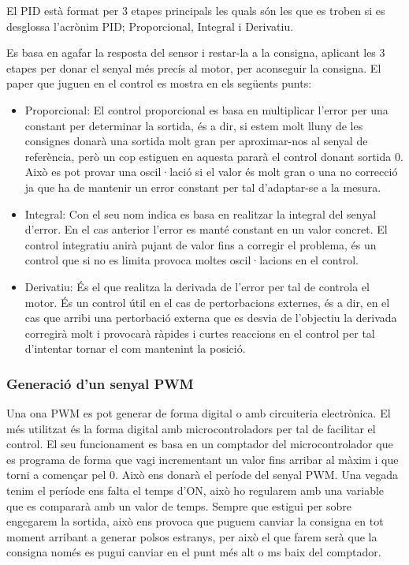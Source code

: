 El PID està format per 3 etapes principals les quals són les que es troben si es desglossa l'acrònim PID; Proporcional, Integral i Derivatiu.

Es basa en agafar la resposta del sensor i restar-la a la consigna, aplicant les 3 etapes per donar el senyal més precís al motor, per aconseguir la consigna. El paper que juguen en el control es mostra en els següents punts: 

\begin{itemize}
    \item Proporcional: El control proporcional es basa en multiplicar l'error per una constant per determinar la sortida, és a dir, si estem molt lluny de les consignes donarà una sortida molt gran per aproximar-nos al senyal de referència, però un cop estiguen en aquesta pararà el control donant sortida 0. Això es pot provar una oscil·lació si el valor és molt gran o una no correcció ja que ha de mantenir un error constant per tal d'adaptar-se a la mesura.
    
    \item Integral: Con el seu nom indica es basa en realitzar la integral del senyal d'error. En el cas anterior l'error es manté constant en un valor concret. El control integratiu anirà pujant de valor fins a corregir el problema, és un control que si no es limita provoca moltes oscil·lacions en el control. 
    
    \item Derivatiu: És el que realitza la derivada de l'error per tal de controla el motor. És un control útil en el cas de pertorbacions externes, és a dir, en el cas que arribi una pertorbació externa que es desvia de l'objectiu la derivada corregirà molt i provocarà ràpides i curtes reaccions en el control per tal d'intentar tornar el com mantenint la posició.
\end{itemize}    
    
\subsubsection{Generació d'un senyal PWM}
Una ona PWM es pot generar de forma digital o amb circuiteria electrònica. El més utilitzat és la forma digital amb microcontroladors per tal de facilitar el control. El seu funcionament es basa en un comptador del microcontrolador que es programa de forma que vagi incrementant un valor fins arribar al màxim i que torni a començar pel 0. Això ens donarà el període del senyal PWM. Una vegada tenim el període ens falta el temps d'ON, això ho regularem amb una variable que es compararà amb un valor de temps. Sempre que estigui per sobre engegarem la sortida, això ens provoca que puguem canviar la consigna en tot moment arribant a generar polsos estranys, per això el que farem serà que la consigna només es pugui canviar en el punt més alt o ms baix del comptador.

